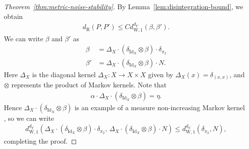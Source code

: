 \documentclass[twoside,11pt]{article}
\DeclareMathOperator{\id}{Id}
\newcommand{\dexp}[1][]{d_{\mathrm{R}#1}}
\newcommand{\dWkernp}[1]{d_{\mathrm{W},#1}}
\newcommand{\dWkern}{\dWkernp{1}}
\begin{document}
\begin{proof}[Theorem~\ref{thm:metric-noise-stability}]
    By Lemma~\ref{lem:disintegration-bound}, we obtain
    \begin{align*}
        \dexp(P,P') \leq C\dWkern^{d_Y}(\beta,\beta').
    \end{align*}
    We can write $\beta$ and $\beta'$ as
    \begin{align*}
        \beta & = \Delta_X \cdot (\delta_{\id_X}\otimes \beta) \cdot \delta_{\pi_2} \\
        \beta' & = \Delta_X \cdot (\delta_{\id_X}\otimes \beta) \cdot N.
    \end{align*}
    Here $\Delta_X$ is the diagonal kernel $\Delta_X:X\to X\times X$ given by $\Delta_X(x) = \delta_{(x,x)}$, and $\otimes$ represents the product of Markov kernels.
    Note that
    \begin{align*}
        \alpha\cdot\Delta_X \cdot (\delta_{\id_X}\otimes \beta)=\eta.
    \end{align*}
    Hence $\Delta_X \cdot (\delta_{\id_X}\otimes \beta)$ is an example of a measure non-increasing Markov kernel \citep[Proposition 6.1]{patterson2020}, so we can write
    \begin{align*}
        \dWkern^{d_Y}(\Delta_X \cdot (\delta_{\id_X}\otimes \beta) \cdot \delta_{\pi_2},\, \Delta_X \cdot (\delta_{\id_X}\otimes \beta) \cdot N)
        \leq \dWkern^{d_Y}(\delta_{\pi_2},N),
    \end{align*}
    completing the proof.
\end{proof}
\end{document}
